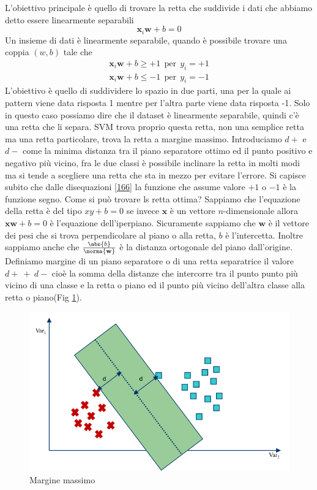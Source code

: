 \noindent L'obiettivo principale è quello di trovare la retta che suddivide i dati che abbiamo detto essere linearmente separabili
\begin{equation}
\mathbf{x}_i \mathbf{w} + b = 0
\end{equation}
Un insieme di dati è linearmente separabile, quando è possibile trovare una coppia $(w,b)$ tale che
\begin{gather}\label{166}
\mathbf{x}_i \mathbf{w} + b \geq +1	\ \ \text{per} \ \ y_i=+1\\
\mathbf{x}_i \mathbf{w} + b \leq -1	\ \ \text{per} \ \ y_i=-1
\end{gather}
L'obiettivo è quello di suddividere lo spazio in due parti, una per la quale ai pattern viene data risposta 1 mentre per l'altra parte viene data risposta -1. Solo in questo caso possiamo dire che il dataset è linearmente separabile, quindi c'è una retta che li separa. SVM trova proprio questa retta, non una semplice retta ma una retta particolare, trova la retta a margine massimo. Introduciamo $d+$ e $d-$ come la minima distanza  tra il piano separatore ottimo ed il punto positivo e negativo più vicino, fra le due classi è possibile inclinare la retta in molti modi ma si tende a scegliere una retta che sta in mezzo per evitare l'errore. Si capisce subito che dalle disequazioni \ref{166} la funzione che assume valore $+1$ o $-1$ è la funzione segno. Come si può trovare ls retta ottima? Sappiamo che l'equazione della retta è del tipo $xy + b = 0$ se invece $\mathbf{x}$ è un vettore $n$-dimensionale allora $\mathbf{x}\mathbf{w} + b = 0$ è l'equazione dell'iperpiano. Sicuramente sappiamo che $\mathbf{w}$ è il vettore dei pesi che si trova perpendicolare al piano o alla retta, $b$ è l'intercetta. Inoltre sappiamo anche che $\frac{\abs{b}}{\norma{\mathbf{w}}}$ è la distanza ortogonale del piano dall'origine. Definiamo margine di un piano separatore o di una retta separatrice il valore $d+ \ + \ d-$ cioè la somma della distanze che intercorre tra il punto punto più vicino di una classe e la retta o piano ed il punto più vicino dell'altra classe alla retta o piano(Fig \ref{svm}).
\begin{figure}
\centering
\includegraphics[scale=1]{img/svm.png}
\caption{Margine massimo}
\label{svm}
\end{figure}
